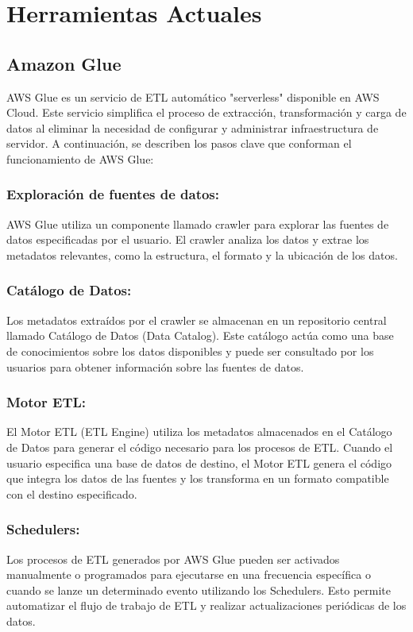 \section{Herramientas Actuales} \label{section:actual_tools}

\subsection{Amazon Glue}

AWS Glue es un servicio de ETL automático "serverless" disponible en AWS Cloud. Este servicio simplifica el proceso de 
extracción, transformación y carga de datos al eliminar la necesidad de configurar y administrar infraestructura de 
servidor. A continuación, se describen los pasos clave que conforman el funcionamiento de AWS Glue:

\subsubsection{Exploración de fuentes de datos:}
AWS Glue utiliza un componente llamado crawler para explorar las fuentes de datos 
especificadas por el usuario. El crawler analiza los datos y extrae los metadatos relevantes, como la estructura, el 
formato y la ubicación de los datos.

\subsubsection{Catálogo de Datos:}
Los metadatos extraídos por el crawler se almacenan en un repositorio central llamado Catálogo de 
Datos (Data Catalog). Este catálogo actúa como una base de conocimientos sobre los datos disponibles y puede ser 
consultado por los usuarios para obtener información sobre las fuentes de datos.

\subsubsection{Motor ETL:}
El Motor ETL (ETL Engine) utiliza los metadatos almacenados en el Catálogo de Datos para generar el código 
necesario para los procesos de ETL. Cuando el usuario especifica una base de datos de destino, el Motor ETL genera el 
código que integra los datos de las fuentes y los transforma en un formato compatible con el destino especificado.

\subsubsection{Schedulers:}
Los procesos de ETL generados por AWS Glue pueden ser activados manualmente o programados para ejecutarse en 
una frecuencia específica o cuando se lanze un determinado evento utilizando los Schedulers. Esto permite automatizar el 
flujo de trabajo de ETL y realizar actualizaciones periódicas de los datos.





